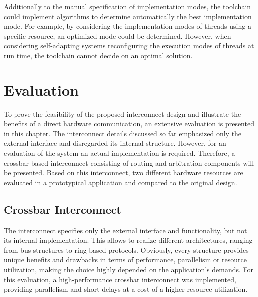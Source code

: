 Additionally to the manual specification of implementation modes, the
toolchain could implement algorithms to determine automatically the best
implementation mode. For example, by considering the implementation modes of
threads using a specific resource, an optimized mode could be determined.
However, when considering self-adapting systems reconfiguring the execution
modes of threads at run time, the toolchain cannot decide on an optimal
solution.

\section{Evaluation}
To prove the feasibility of the proposed interconnect design and illustrate
the benefits of a direct hardware communication, an extensive evaluation is
presented in this chapter. The interconnect details discussed so far
emphasized only the external interface and disregarded its internal structure.
However, for an evaluation of the system an actual implementation is required.
Therefore, a crossbar based interconnect consisting of routing and arbitration
components will be presented. Based on this interconnect, two different
hardware resources are evaluated in a prototypical application and compared to
the original design.

\subsection{Crossbar Interconnect}
The interconnect specifies only the external interface and functionality, but
not its internal implementation. This allows to realize different
architectures, ranging from bus structures to ring based protocols. Obviously,
every structure provides unique benefits and drawbacks in terms of
performance, parallelism or resource utilization, making the choice highly
depended on the application's demands. For this evaluation, a high-performance
crossbar interconnect was implemented, providing parallelism and short delays
at a cost of a higher resource utilization.

